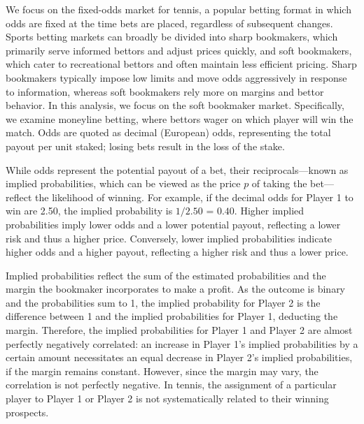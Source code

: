 \documentclass[webpdf,modern,medium]{oup-authoring-template}
\theoremstyle{thmstyleone}%
\theoremstyle{thmstyletwo}%
\theoremstyle{thmstylethree}%
\begin{document}
We focus on the fixed-odds market for tennis, a popular betting format in which odds are fixed at the time bets are placed, regardless of subsequent changes. Sports betting markets can broadly be divided into sharp bookmakers, which primarily serve informed bettors and adjust prices quickly, and soft bookmakers, which cater to recreational bettors and often maintain less efficient pricing. Sharp bookmakers typically impose low limits and move odds aggressively in response to information, whereas soft bookmakers rely more on margins and bettor behavior. In this analysis, we focus on the soft bookmaker market. Specifically, we examine moneyline betting, where bettors wager on which player will win the match.
Odds are quoted as decimal (European) odds, representing the total payout per unit staked; losing bets result in the loss of the stake.


While odds represent the potential payout of a bet, their reciprocals---known as implied probabilities, which can be viewed as the price $p$ of taking the bet---reflect the likelihood of winning. For example, if the decimal odds for Player 1 to win are 2.50, the implied probability is $\text{1/2.50 = 0.40}$. Higher implied probabilities imply lower odds and a lower potential payout, reflecting a lower risk and thus a higher price. Conversely, lower implied probabilities indicate higher odds and a higher payout, reflecting a higher risk and thus a lower price.

Implied probabilities reflect the sum of the estimated probabilities and the margin the bookmaker incorporates to make a profit. As the outcome is binary and the probabilities sum to 1, the implied probability for Player 2 is the difference between 1 and the implied probabilities for Player 1, deducting the margin. Therefore, the implied probabilities for Player 1 and Player 2 are almost perfectly negatively correlated: an increase in Player 1's implied probabilities by a certain amount necessitates an equal decrease in Player 2's implied probabilities, if the margin remains constant. However, since the margin may vary, the correlation is not perfectly negative. In tennis, the assignment of a particular player to Player 1 or Player 2 is not systematically related to their winning prospects.
\end{document}
